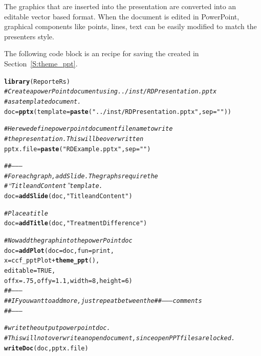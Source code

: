 \documentclass[nojss, letterpaper]{jss}\usepackage[]{graphicx}\usepackage[]{color}
\makeatletter
\newcommand{\hlnum}[1]{\textcolor[rgb]{0.686,0.059,0.569}{#1}}%
\newcommand{\hlstr}[1]{\textcolor[rgb]{0.192,0.494,0.8}{#1}}%
\newcommand{\hlcom}[1]{\textcolor[rgb]{0.678,0.584,0.686}{\textit{#1}}}%
\newcommand{\hlopt}[1]{\textcolor[rgb]{0,0,0}{#1}}%
\newcommand{\hlstd}[1]{\textcolor[rgb]{0.345,0.345,0.345}{#1}}%
\newcommand{\hlkwb}[1]{\textcolor[rgb]{0.69,0.353,0.396}{#1}}%
\newcommand{\hlkwc}[1]{\textcolor[rgb]{0.333,0.667,0.333}{#1}}%
\newcommand{\hlkwd}[1]{\textcolor[rgb]{0.737,0.353,0.396}{\textbf{#1}}}%
\newenvironment{kframe}{%
 \def\at@end@of@kframe{}%
 \ifinner\ifhmode%
  \def\at@end@of@kframe{\end{minipage}}%
  \begin{minipage}{\columnwidth}%
 \fi\fi%
 \def\FrameCommand##1{\hskip\@totalleftmargin \hskip-\fboxsep
 \colorbox{shadecolor}{##1}\hskip-\fboxsep
     \hskip-\linewidth \hskip-\@totalleftmargin \hskip\columnwidth}%
 \MakeFramed {\advance\hsize-\width
   \@totalleftmargin\z@ \linewidth\hsize
   \@setminipage}}%
 {\par\unskip\endMakeFramed%
 \at@end@of@kframe}
\newenvironment{knitrout}{}{} %
\makeatother
\begin{document}
The  graphics that are inserted into the presentation are converted into an editable vector based format. When the document is edited in PowerPoint, graphical components like points, lines, text can be easily modified to match the presenters style.

The following code block is an  recipe for saving the  created in Section~\ref{S:theme_ppt}. 
\begin{knitrout}\footnotesize
{}\color{fgcolor}\begin{kframe}
\begin{alltt}
\hlkwd{library}\hlstd{(ReporteRs)}
\hlcom{# Create a powerPoint document using ../inst/RDPresentation.pptx }
\hlcom{# as a template document.}
\hlstd{doc} \hlkwb{=} \hlkwd{pptx}\hlstd{(}\hlkwc{template}\hlstd{=}\hlkwd{paste}\hlstd{(}\hlstr{"../inst/RDPresentation.pptx"}\hlstd{,} \hlkwc{sep}\hlstd{=}\hlstr{""}\hlstd{))}

\hlcom{# Here we define powerpoint document filename to write}
\hlcom{# the presentation. This will be overwritten}
\hlstd{pptx.file} \hlkwb{=} \hlkwd{paste}\hlstd{(}\hlstr{"RDExample.pptx"}\hlstd{,} \hlkwc{sep}\hlstd{=}\hlstr{""}\hlstd{)}

\hlcom{##--------}
\hlcom{# For each graph, addSlide. The graphs require the }
\hlcom{# “Title and Content” template.}
\hlstd{doc} \hlkwb{=} \hlkwd{addSlide}\hlstd{( doc,} \hlstr{"Title and Content"} \hlstd{)}

\hlcom{# Place a title}
\hlstd{doc} \hlkwb{=} \hlkwd{addTitle}\hlstd{( doc,} \hlstr{"Treatment Difference"} \hlstd{)}

\hlcom{# Now add the graph into the powerPoint doc }
\hlstd{doc} \hlkwb{=} \hlkwd{addPlot}\hlstd{(} \hlkwc{doc}\hlstd{=doc,} \hlkwc{fun}\hlstd{=print,}
               \hlkwc{x}\hlstd{=ccf_pptPlot}\hlopt{+}\hlkwd{theme_ppt}\hlstd{() ,}
               \hlkwc{editable} \hlstd{=} \hlnum{TRUE}\hlstd{,}
               \hlkwc{offx}\hlstd{=}\hlnum{.75}\hlstd{,} \hlkwc{offy}\hlstd{=}\hlnum{1.1}\hlstd{,} \hlkwc{width}\hlstd{=}\hlnum{8}\hlstd{,} \hlkwc{height}\hlstd{=}\hlnum{6}\hlstd{)}
\hlcom{##--------}
\hlcom{## IF you want to add more, just repeat between the ##-------- comments}
\hlcom{##--------}

\hlcom{# write the output powerpoint doc. }
\hlcom{# This will not overwrite an open document, since open PPT files are locked.}
\hlkwd{writeDoc}\hlstd{( doc, pptx.file )}
\end{alltt}
\end{kframe}
\end{knitrout}
\end{document}
